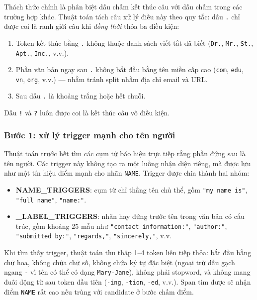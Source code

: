 Thách thức chính là phân biệt dấu chấm kết thúc câu với dấu chấm trong các
trường hợp khác. Thuật toán tách câu xử lý điều này theo quy tắc: dấu
\texttt{.} chỉ được coi là ranh giới câu khi \textit{đồng thời} thỏa ba điều
kiện:

\begin{enumerate}[nosep]
    \item Token kết thúc bằng \texttt{.} không thuộc danh sách viết tắt đã biết
          (\texttt{Dr.}, \texttt{Mr.}, \texttt{St.}, \texttt{Apt.}, \texttt{Inc.}, v.v.).
    \item Phần văn bản ngay sau \texttt{.} không bắt đầu bằng tên miền cấp cao
          (\texttt{com}, \texttt{edu}, \texttt{vn}, \texttt{org}, v.v.) --- nhằm
          tránh split nhầm địa chỉ email và URL.
    \item Sau dấu \texttt{.} là khoảng trắng hoặc hết chuỗi.
\end{enumerate}

Dấu \texttt{!} và \texttt{?} luôn được coi là kết thúc câu vô điều kiện.

\subsubsection*{Bước 1: xử lý trigger mạnh cho tên người}

Thuật toán trước hết tìm các cụm từ báo hiệu trực tiếp rằng phần đứng sau là
tên người. Các trigger này không tạo ra một luồng nhận diện riêng, mà được lưu
như một tín hiệu điểm mạnh cho nhãn \texttt{NAME}. Trigger được chia thành hai
nhóm:

\begin{itemize}[nosep]
    \item \textbf{NAME\_TRIGGERS}: cụm từ chỉ thẳng tên chủ thể, gồm
          \texttt{"my name is"}, \texttt{"full name"}, \texttt{"name:"}.
    \item \textbf{\_LABEL\_TRIGGERS}: nhãn hay đứng trước tên trong văn bản có
          cấu trúc, gồm khoảng 25 mẫu như \texttt{"contact information:"},
          \texttt{"author:"}, \texttt{"submitted by:"}, \texttt{"regards,"},
          \texttt{"sincerely,"}, v.v.
\end{itemize}

Khi tìm thấy trigger, thuật toán thu thập 1--4 token liên tiếp thỏa:
bắt đầu bằng chữ hoa, không chứa chữ số, không chứa ký tự đặc biệt (ngoại
trừ dấu gạch ngang \texttt{-} vì tên có thể có dạng \texttt{Mary-Jane}),
không phải stopword, và không mang đuôi động từ sau token đầu tiên
(\texttt{-ing}, \texttt{-tion}, \texttt{-ed}, v.v.). Span tìm được sẽ nhận điểm
\texttt{NAME} rất cao nếu trùng với candidate ở bước chấm điểm.

